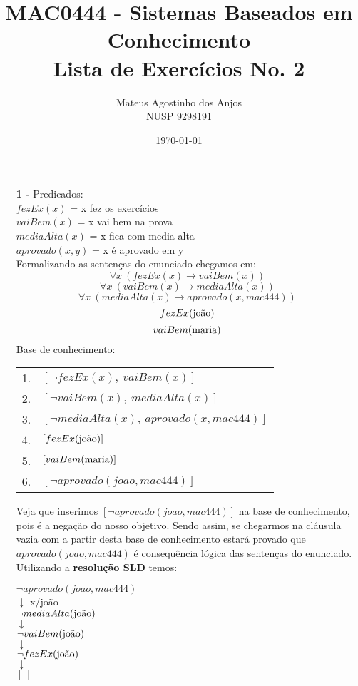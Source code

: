 \documentclass[12pt]{article}
\title{MAC0444 - Sistemas Baseados em Conhecimento \\
Lista de Exercícios No. 2
}
\author{Mateus Agostinho dos Anjos\\NUSP 9298191}
\date{\today}
\begin{document}
	\maketitle
	\begin{itemize}
		\item[\textbf{1 -}]
			\hfill\newline
			Predicados:\\
			$fezEx(x)$ = x fez os exercícios\\
			$vaiBem(x)$ = x vai bem na prova\\
			$mediaAlta(x)$ = x fica com media alta\\
			$aprovado(x, y)$ = x é aprovado em y \\
			\newline
			Formalizando as sentenças do enunciado chegamos em:\\
			$$\forall x \ (fezEx(x) \rightarrow vaiBem(x))$$
			$$\forall x \ (vaiBem(x) \rightarrow mediaAlta(x))$$
			$$\forall x \ (mediaAlta(x) \rightarrow aprovado(x, mac444))$$
			$$fezEx(\textnormal{joão})$$
			$$vaiBem(\textnormal{maria})$$
			Base de conhecimento:\\
			\begin{center}
				\begin{tabular}{c l}
				1. & $[\neg fezEx(x), \ vaiBem(x)]$\\
				2. & $[\neg vaiBem(x), \ mediaAlta(x)]$\\
				3. & $[\neg mediaAlta(x), \ aprovado(x, mac444)] $\\
				4. & $[fezEx(\textnormal{joão})]$\\
				5. & $[vaiBem(\textnormal{maria})]$\\
				6. & $[\neg aprovado(joao, mac444)]$\\
				\end{tabular}
			\end{center}
			Veja que inserimos $[\neg aprovado(joao, mac444)]$ na base de conhecimento, pois
			é a negação do nosso objetivo. Sendo assim, se chegarmos na cláusula vazia com
			a partir desta base de conhecimento estará provado que $aprovado(joao, mac444)$
			é consequência lógica das sentenças do enunciado.\\
			\newline
			Utilizando a \textbf{resolução SLD} temos:\\
			\begin{center}
				$\neg aprovado(joao, mac444)$\\
				$\downarrow$ x/joão\\
				$\neg mediaAlta(\textnormal{joão})$\\
				$\downarrow$\\
				$\neg vaiBem(\textnormal{joão})$\\
				$\downarrow$\\
				$\neg fezEx(\textnormal{joão})$\\
				$\downarrow$\\
				$[ \ ]$
				
			\end{center}
	\end{itemize}
\end{document}
